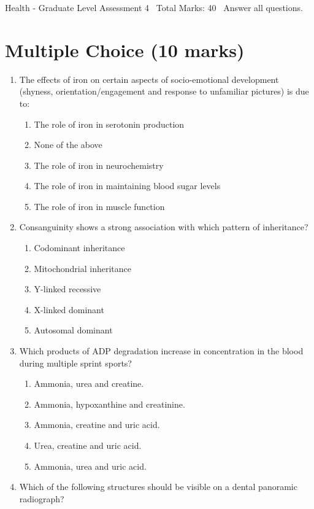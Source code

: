 \documentclass[12pt]{article}
\begin{document}
\begin{center}
Health - Graduate Level Assessment 4 \
Total Marks: 40 \
Answer all questions.
\end{center}

\section*{Multiple Choice (10 marks)}
\begin{enumerate}[label=\arabic*.]
\item The effects of iron on certain aspects of socio-emotional development (shyness,
orientation/engagement and response to unfamiliar pictures) is due to:
\begin{enumerate}[label=(\alph*)]
    \item The role of iron in serotonin production
    \item None of the above
    \item The role of iron in neurochemistry
    \item The role of iron in maintaining blood sugar levels
    \item The role of iron in muscle function
\end{enumerate}
\item Consanguinity shows a strong association with which pattern of inheritance?
\begin{enumerate}[label=(\alph*)]
    \item Codominant inheritance
    \item Mitochondrial inheritance
    \item Y-linked recessive
    \item X-linked dominant
    \item Autosomal dominant
\end{enumerate}
\item Which products of ADP degradation increase in concentration in the blood during multiple
sprint sports?
\begin{enumerate}[label=(\alph*)]
    \item Ammonia, urea and creatine.
    \item Ammonia, hypoxanthine and creatinine.
    \item Ammonia, creatine and uric acid.
    \item Urea, creatine and uric acid.
    \item Ammonia, urea and uric acid.
\end{enumerate}
\item Which of the following structures should be visible on a dental panoramic radiograph?

\end{enumerate}
\end{document}
